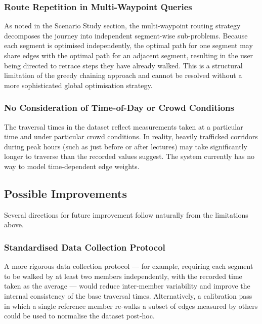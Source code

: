 \documentclass[a4paper,10pt]{amsart}
\begin{document}
\subsubsection{Route Repetition in Multi-Waypoint Queries}

As noted in the Scenario Study section, the multi-waypoint routing strategy decomposes the journey into independent segment-wise sub-problems.
Because each segment is optimised independently, the optimal path for one segment may share edges with the optimal path for an adjacent segment, resulting in the user being directed to retrace steps they have already walked.
This is a structural limitation of the greedy chaining approach and cannot be resolved without a more sophisticated global optimisation strategy.

\subsubsection{No Consideration of Time-of-Day or Crowd Conditions}

The traversal times in the dataset reflect measurements taken at a particular time and under particular crowd conditions.
In reality, heavily trafficked corridors during peak hours (such as just before or after lectures) may take significantly longer to traverse than the recorded values suggest.
The system currently has no way to model time-dependent edge weights.

\subsection{Possible Improvements}

Several directions for future improvement follow naturally from the limitations above.

\subsubsection{Standardised Data Collection Protocol}

A more rigorous data collection protocol --- for example, requiring each segment to be walked by at least two members independently, with the recorded time taken as the average --- would reduce inter-member variability and improve the internal consistency of the base traversal times.
Alternatively, a calibration pass in which a single reference member re-walks a subset of edges measured by others could be used to normalise the dataset post-hoc.
\end{document}
